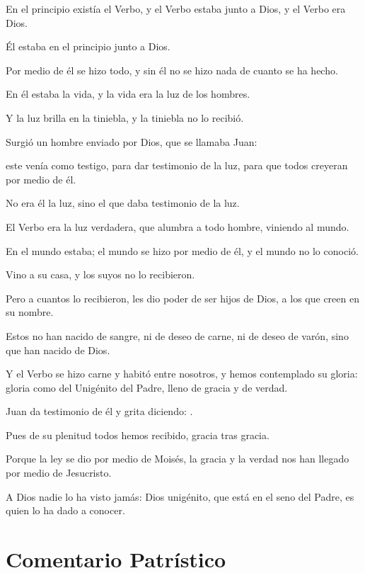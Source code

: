 \begin{scripture}
	En el principio existía el Verbo, y el Verbo estaba junto a Dios, y el Verbo era Dios.
	
	Él estaba en el principio junto a Dios.
	
	Por medio de él se hizo todo, y sin él no se hizo nada de cuanto se ha hecho.
	
	En él estaba la vida, y la vida era la luz de los hombres.
	
	Y la luz brilla en la tiniebla, y la tiniebla no lo recibió.
	
	Surgió un hombre enviado por Dios, que se llamaba Juan:
	
	este venía como testigo, para dar testimonio de la luz, para que todos creyeran por medio de él.
	
	No era él la luz, sino el que daba testimonio de la luz.
	
	El Verbo era la luz verdadera, que alumbra a todo hombre, viniendo al mundo.
	
	En el mundo estaba; el mundo se hizo por medio de él, y el mundo no lo conoció.
	
	Vino a su casa, y los suyos no lo recibieron.
	
	Pero a cuantos lo recibieron, les dio poder de ser hijos de Dios, a los que creen en su nombre.
	
	Estos no han nacido de sangre, ni de deseo de carne, ni de deseo de varón, sino que han nacido de Dios.
	
	Y el Verbo se hizo carne y habitó entre nosotros, y hemos contemplado su gloria: gloria como del Unigénito del Padre, lleno de gracia y de verdad.
	
	Juan da testimonio de él y grita diciendo: .
	
	Pues de su plenitud todos hemos recibido, gracia tras gracia.
	
	Porque la ley se dio por medio de Moisés, la gracia y la verdad nos han llegado por medio de Jesucristo.
	
	A Dios nadie lo ha visto jamás: Dios unigénito, que está en el seno del Padre, es quien lo ha dado a conocer.
\end{scripture}


\section{Comentario Patrístico}

